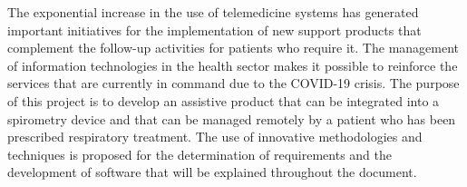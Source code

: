 The exponential increase in the use of telemedicine systems has generated important initiatives for the implementation of new support products that complement the follow-up activities for patients who require it. The management of information technologies in the health sector makes it possible to reinforce the services that are currently in command due to the COVID-19 crisis. The purpose of this project is to develop an assistive product that can be integrated into a spirometry device and that can be managed remotely by a patient who has been prescribed respiratory treatment. The use of innovative methodologies and techniques is proposed for the determination of requirements and the development of software that will be explained throughout the document.